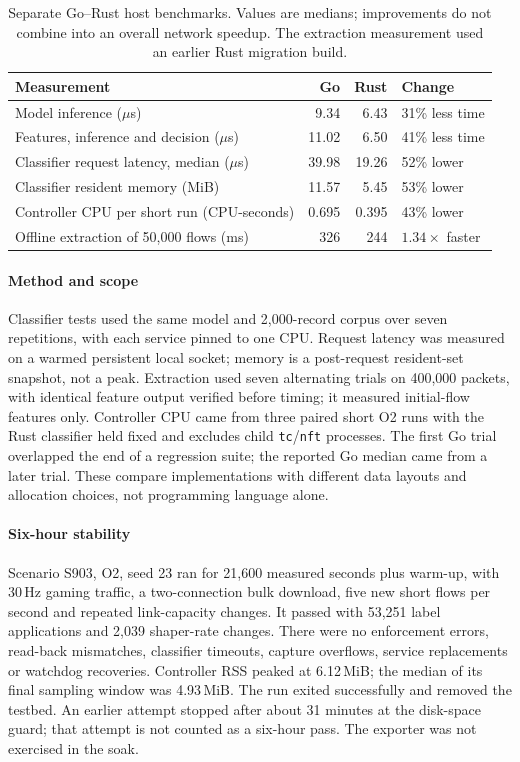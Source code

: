 \documentclass[11pt,a4paper]{article}
\begin{document}
\begin{table}[H]\centering\small
\begin{tabularx}{\linewidth}{@{}>{\raggedright\arraybackslash}Xrrl@{}}
\toprule
Measurement & Go & Rust & Change \\
\midrule
Model inference ($\mu$s) & 9.34 & 6.43 & 31\% less time \\
Features, inference and decision ($\mu$s) & 11.02 & 6.50 & 41\% less time \\
Classifier request latency, median ($\mu$s) & 39.98 & 19.26 & 52\% lower \\
Classifier resident memory (MiB) & 11.57 & 5.45 & 53\% lower \\
Controller CPU per short run (CPU-seconds) & 0.695 & 0.395 & 43\% lower \\
Offline extraction of 50,000 flows (ms) & 326 & 244 & $1.34\times$ faster \\
\bottomrule
\end{tabularx}
\caption{Separate Go--Rust host benchmarks. Values are medians; improvements do not combine into an overall network speedup. The extraction measurement used an earlier Rust migration build.}
\end{table}

\paragraph{Method and scope} Classifier tests used the same model and 2,000-record corpus over seven repetitions, with each service pinned to one CPU. Request latency was measured on a warmed persistent local socket; memory is a post-request resident-set snapshot, not a peak. Extraction used seven alternating trials on 400,000 packets, with identical feature output verified before timing; it measured initial-flow features only. Controller CPU came from three paired short O2 runs with the Rust classifier held fixed and excludes child \texttt{tc}/\texttt{nft} processes. The first Go trial overlapped the end of a regression suite; the reported Go median came from a later trial. These compare implementations with different data layouts and allocation choices, not programming language alone.

\paragraph{Six-hour stability} Scenario S903, O2, seed 23 ran for 21,600 measured seconds plus warm-up, with 30\,Hz gaming traffic, a two-connection bulk download, five new short flows per second and repeated link-capacity changes. It passed with 53,251 label applications and 2,039 shaper-rate changes. There were no enforcement errors, read-back mismatches, classifier timeouts, capture overflows, service replacements or watchdog recoveries. Controller RSS peaked at 6.12\,MiB; the median of its final sampling window was 4.93\,MiB. The run exited successfully and removed the testbed. An earlier attempt stopped after about 31 minutes at the disk-space guard; that attempt is not counted as a six-hour pass. The exporter was not exercised in the soak.
\end{document}
